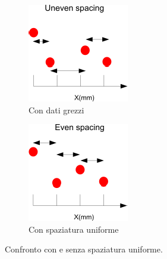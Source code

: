 \begin{figure}[H]
	\centering
	\begin{subfigure}{.3\linewidth}
		\centering
		\includegraphics[width = \linewidth]{./pictures/uniform_spacing_1.png}
    	\caption{Con dati grezzi}
    \end{subfigure}
    \hspace{1em}
    \begin{subfigure}{.3\linewidth}
		\centering
		\includegraphics[width = \linewidth]{./pictures/uniform_spacing_2.png}
    	\caption{Con spaziatura uniforme}
    \end{subfigure}
    \caption{Confronto con e senza spaziatura uniforme.}
    \label{fig:uniform_spacing}
\end{figure}

